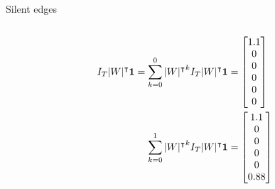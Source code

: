 \begin{frame}{Silent edges}
\begin{columns}
\begin{column}{0.5\textwidth}
{\begin{subequations}
\begin{align*}
I_T |W|^\intercal \boldsymbol{1}
=
\sum_{k=0}^0 {|W|^\intercal}^k
I_T |W|^\intercal \boldsymbol{1}
&=
\begin{bmatrix} 
1.1 \\
0 \\
0 \\
0 \\
0 \\
0 \\
\end{bmatrix}
\\
\sum_{k=0}^1 {|W|^\intercal}^k
I_T |W|^\intercal \boldsymbol{1}
&=
\begin{bmatrix} 
1.1 \\
0 \\
0 \\
0 \\
0 \\
0.88 \\
\end{bmatrix}
\end{align*}
\end{subequations}

}

\end{column}
\end{columns}
\end{frame}
